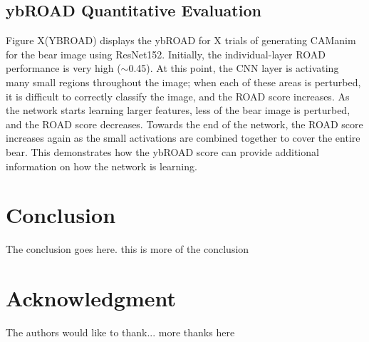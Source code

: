 \documentclass[10pt, conference, compsocconf]{IEEEtran}
\begin{document}
\subsection{ybROAD Quantitative Evaluation}
\label{sec:ybROAD}

Figure X(YBROAD) displays the ybROAD for X trials of generating CAManim for the bear image using ResNet152. Initially, the individual-layer ROAD performance is very high ($\sim$0.45). At this point, the CNN layer is activating many small regions throughout the image; when each of these areas is perturbed, it is difficult to correctly classify the image, and the ROAD score increases. As the network starts learning larger features, less of the bear image is perturbed, and the ROAD score decreases. Towards the end of the network, the ROAD score increases again as the small activations are combined together to cover the entire bear. This demonstrates how the ybROAD score can provide additional information on how the network is learning. %


\section{Conclusion}
The conclusion goes here. this is more of the conclusion

\section*{Acknowledgment}
The authors would like to thank...
more thanks here


 
\end{document}
